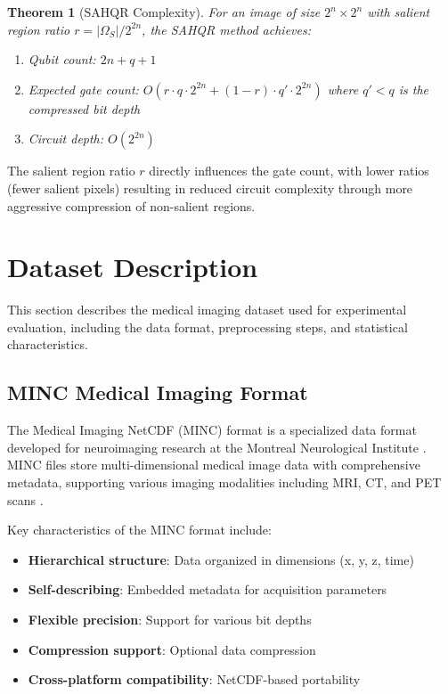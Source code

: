 \documentclass[pdflatex,sn-mathphys-num,Numbered]{sn-jnl}
\theoremstyle{thmstyleone}
\newtheorem{theorem}{Theorem}
\theoremstyle{thmstyletwo}
\theoremstyle{thmstylethree}
\begin{document}
\begin{theorem}[SAHQR Complexity]
For an image of size $2^n \times 2^n$ with salient region ratio $r = |\Omega_S| / 2^{2n}$, the SAHQR method achieves:
\begin{enumerate}
\item Qubit count: $2n + q + 1$
\item Expected gate count: $O(r \cdot q \cdot 2^{2n} + (1-r) \cdot q' \cdot 2^{2n})$ where $q' < q$ is the compressed bit depth
\item Circuit depth: $O(2^{2n})$
\end{enumerate}
\end{theorem}

The salient region ratio $r$ directly influences the gate count, with lower ratios (fewer salient pixels) resulting in reduced circuit complexity through more aggressive compression of non-salient regions.

\section{Dataset Description}\label{sec:dataset}

This section describes the medical imaging dataset used for experimental evaluation, including the data format, preprocessing steps, and statistical characteristics.

\subsection{MINC Medical Imaging Format}

The Medical Imaging NetCDF (MINC) format is a specialized data format developed for neuroimaging research at the Montreal Neurological Institute \cite{bib64}. MINC files store multi-dimensional medical image data with comprehensive metadata, supporting various imaging modalities including MRI, CT, and PET scans \cite{bib60,bib61}.

Key characteristics of the MINC format include:

\begin{itemize}
\item \textbf{Hierarchical structure}: Data organized in dimensions (x, y, z, time)
\item \textbf{Self-describing}: Embedded metadata for acquisition parameters
\item \textbf{Flexible precision}: Support for various bit depths
\item \textbf{Compression support}: Optional data compression
\item \textbf{Cross-platform compatibility}: NetCDF-based portability
\end{itemize}
\end{document}
